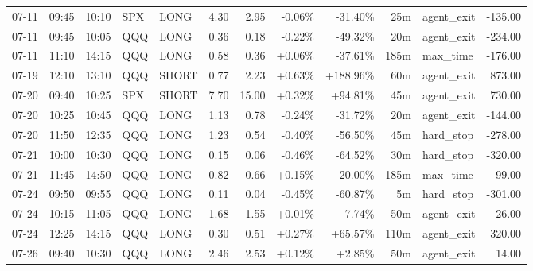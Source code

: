 \documentclass[11pt,a4paper,twoside]{article}
\begin{document}
\begin{center}
\begin{longtable}{>{\color{txtmain}}l l l l l r r r r r >{\color{txtmain}}l r}
07-11 & 09:45 & 10:10 & SPX & LONG & 4.30 & 2.95 & \textcolor{lossred}{-0.06\%} & \textcolor{lossred}{-31.40\%} & 25m & agent\_exit & \textcolor{lossred}{-135.00} \\
07-11 & 09:45 & 10:05 & QQQ & LONG & 0.36 & 0.18 & \textcolor{lossred}{-0.22\%} & \textcolor{lossred}{-49.32\%} & 20m & agent\_exit & \textcolor{lossred}{-234.00} \\
07-11 & 11:10 & 14:15 & QQQ & LONG & 0.58 & 0.36 & \textcolor{wingreen}{+0.06\%} & \textcolor{lossred}{-37.61\%} & 185m & max\_time & \textcolor{lossred}{-176.00} \\
07-19 & 12:10 & 13:10 & QQQ & SHORT & 0.77 & 2.23 & \textcolor{wingreen}{+0.63\%} & \textcolor{wingreen}{+188.96\%} & 60m & agent\_exit & \textcolor{wingreen}{873.00} \\
07-20 & 09:40 & 10:25 & SPX & SHORT & 7.70 & 15.00 & \textcolor{wingreen}{+0.32\%} & \textcolor{wingreen}{+94.81\%} & 45m & agent\_exit & \textcolor{wingreen}{730.00} \\
07-20 & 10:25 & 10:45 & QQQ & LONG & 1.13 & 0.78 & \textcolor{lossred}{-0.24\%} & \textcolor{lossred}{-31.72\%} & 20m & agent\_exit & \textcolor{lossred}{-144.00} \\
07-20 & 11:50 & 12:35 & QQQ & LONG & 1.23 & 0.54 & \textcolor{lossred}{-0.40\%} & \textcolor{lossred}{-56.50\%} & 45m & hard\_stop & \textcolor{lossred}{-278.00} \\
07-21 & 10:00 & 10:30 & QQQ & LONG & 0.15 & 0.06 & \textcolor{lossred}{-0.46\%} & \textcolor{lossred}{-64.52\%} & 30m & hard\_stop & \textcolor{lossred}{-320.00} \\
07-21 & 11:45 & 14:50 & QQQ & LONG & 0.82 & 0.66 & \textcolor{wingreen}{+0.15\%} & \textcolor{lossred}{-20.00\%} & 185m & max\_time & \textcolor{lossred}{-99.00} \\
07-24 & 09:50 & 09:55 & QQQ & LONG & 0.11 & 0.04 & \textcolor{lossred}{-0.45\%} & \textcolor{lossred}{-60.87\%} & 5m & hard\_stop & \textcolor{lossred}{-301.00} \\
07-24 & 10:15 & 11:05 & QQQ & LONG & 1.68 & 1.55 & \textcolor{wingreen}{+0.01\%} & \textcolor{lossred}{-7.74\%} & 50m & agent\_exit & \textcolor{lossred}{-26.00} \\
07-24 & 12:25 & 14:15 & QQQ & LONG & 0.30 & 0.51 & \textcolor{wingreen}{+0.27\%} & \textcolor{wingreen}{+65.57\%} & 110m & agent\_exit & \textcolor{wingreen}{320.00} \\
07-26 & 09:40 & 10:30 & QQQ & LONG & 2.46 & 2.53 & \textcolor{wingreen}{+0.12\%} & \textcolor{wingreen}{+2.85\%} & 50m & agent\_exit & \textcolor{wingreen}{14.00} \\

\end{longtable}
\end{center}
\end{document}
